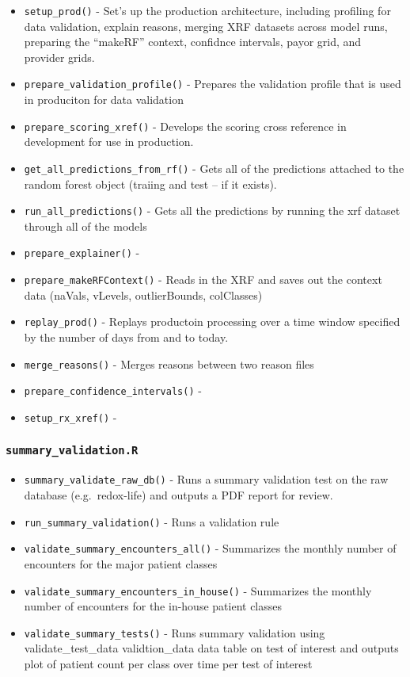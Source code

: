 \documentclass[
]{book}
\providecommand{\tightlist}{%
  \setlength{\itemsep}{0pt}\setlength{\parskip}{0pt}}
\begin{document}
\begin{itemize}
\tightlist
\item
  \texttt{setup\_prod()} - Set's up the production architecture, including profiling for data validation, explain reasons, merging XRF datasets across model runs, preparing the ``makeRF'' context, confidnce intervals, payor grid, and provider grids.
\item
  \texttt{prepare\_validation\_profile()} - Prepares the validation profile that is used in produciton for data validation
\item
  \texttt{prepare\_scoring\_xref()} - Develops the scoring cross reference in development for use in production.
\item
  \texttt{get\_all\_predictions\_from\_rf()} - Gets all of the predictions attached to the random forest object (traiing and test -- if it exists).
\item
  \texttt{run\_all\_predictions()} - Gets all the predictions by running the xrf dataset through all of the models
\item
  \texttt{prepare\_explainer()} -
\item
  \texttt{prepare\_makeRFContext()} - Reads in the XRF and saves out the context data (naVals, vLevels, outlierBounds, colClasses)
\item
  \texttt{replay\_prod()} - Replays productoin processing over a time window specified by the number of days from and to today.
\item
  \texttt{merge\_reasons()} - Merges reasons between two reason files
\item
  \texttt{prepare\_confidence\_intervals()} -
\item
  \texttt{setup\_rx\_xref()} -
\end{itemize}

\hypertarget{summary_validation.r}{%
\subsubsection{\texorpdfstring{\texttt{summary\_validation.R}}{summary\_validation.R}}\label{summary_validation.r}}

\begin{itemize}
\tightlist
\item
  \texttt{summary\_validate\_raw\_db()} - Runs a summary validation test on the raw database (e.g.~redox-life) and outputs a PDF report for review.
\item
  \texttt{run\_summary\_validation()} - Runs a validation rule
\item
  \texttt{validate\_summary\_encounters\_all()} - Summarizes the monthly number of encounters for the major patient classes
\item
  \texttt{validate\_summary\_encounters\_in\_house()} - Summarizes the monthly number of encounters for the in-house patient classes
\item
  \texttt{validate\_summary\_tests()} - Runs summary validation using validate\_test\_data validtion\_data data table on test of interest and outputs plot of patient count per class over time per test of interest
\end{itemize}
\end{document}
